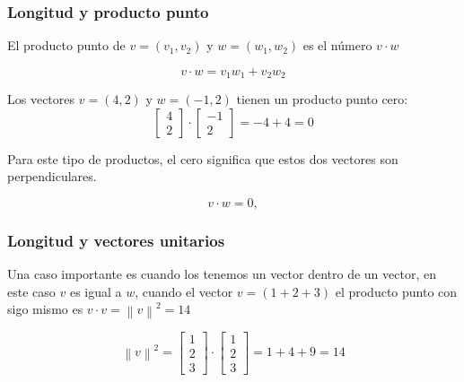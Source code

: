 \subsubsection{Longitud y producto punto}

\begin{definition}
	El producto punto de $v= (v_{1},v_2 )$ y $w=(w_{1},w_2 )$
	es el número $v \cdot w$
\end{definition}

\begin{equation}
	v \cdot w = v_{1}w_1+ v_2 w_2 
\end{equation}

\begin{example}
	Los vectores $v=(4,2)$ y $w=(-1,2)$ tienen un producto punto cero:
	\begin{equation*}
		\begin{bmatrix} 4\\ 2 \end{bmatrix} \cdot \begin{bmatrix} -1\\ 2 \end{bmatrix}=-4+4=0
	\end{equation*}
\end{example}

Para este tipo de productos, el cero significa que estos dos vectores son perpendiculares.

\begin{equation}
	v\cdot w=0,
	\label{vecperpendicular}
\end{equation}

\subsubsection{Longitud y vectores unitarios}
Una caso importante es cuando los tenemos un vector dentro de un vector, en este caso $v$ es igual a $w$,
cuando el vector $v=(1+2+3)$ el producto punto con sigo mismo es $v \cdot v = \left\lVert v\right\rVert ^2  = 14 $

\begin{example}
	\[\left \| v \right \|^2 = \begin{bmatrix} 1\\ 2\\ 3 \end{bmatrix} \cdot \begin{bmatrix} 1\\ 2\\ 3 \end{bmatrix}=1+4+9=14\]
\end{example}

